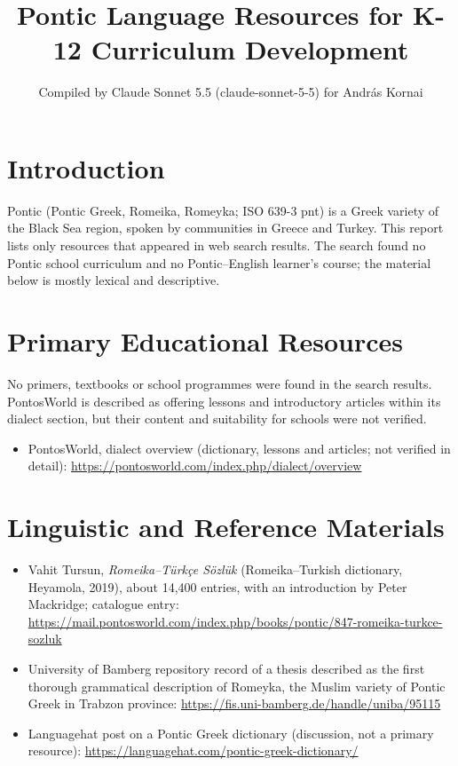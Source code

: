 \documentclass[12pt]{article}
\title{Pontic Language Resources for K-12 Curriculum Development}
\author{Compiled by Claude Sonnet 5.5 (claude-sonnet-5-5) for Andr\'as Kornai}
\date{}
\begin{document}
\maketitle

\section{Introduction}
Pontic (Pontic Greek, Romeika, Romeyka; ISO 639-3 pnt) is a Greek variety of the Black Sea region, spoken by communities in Greece and Turkey. This report lists only resources that appeared in web search results. The search found no Pontic school curriculum and no Pontic--English learner's course; the material below is mostly lexical and descriptive.

\section{Primary Educational Resources}
No primers, textbooks or school programmes were found in the search results. PontosWorld is described as offering lessons and introductory articles within its dialect section, but their content and suitability for schools were not verified.
\begin{itemize}
\item PontosWorld, dialect overview (dictionary, lessons and articles; not verified in detail): \url{https://pontosworld.com/index.php/dialect/overview}
\end{itemize}

\section{Linguistic and Reference Materials}
\begin{itemize}
\item Vahit Tursun, \emph{Romeika--T\"urk\c{c}e S\"ozl\"uk} (Romeika--Turkish dictionary, Heyamola, 2019), about 14,400 entries, with an introduction by Peter Mackridge; catalogue entry: \url{https://mail.pontosworld.com/index.php/books/pontic/847-romeika-turkce-sozluk}
\item University of Bamberg repository record of a thesis described as the first thorough grammatical description of Romeyka, the Muslim variety of Pontic Greek in Trabzon province: \url{https://fis.uni-bamberg.de/handle/uniba/95115}
\item Languagehat post on a Pontic Greek dictionary (discussion, not a primary resource): \url{https://languagehat.com/pontic-greek-dictionary/}
\end{itemize}
\end{document}
